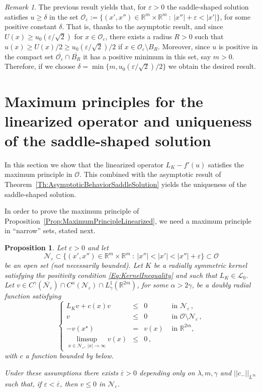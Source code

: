 \documentclass[12pt,reqno]{amsart}
\newtheorem{proposition}[theorem]{Proposition}
\theoremstyle{definition}
\theoremstyle{remark}
\newtheorem{remark}[theorem]{Remark}
\newcommand{\con}[1]{\mathbb{#1}}
\newcommand{\R}{\con{R}} %
\newcommand{\lcal}{\mathcal{L}}
\newcommand{\ncal}{\mathcal{N}}
\newcommand{\ocal}{\mathcal{O}}
\newcommand{\s}{\gamma}
\newcommand\beqc[1]{\left\{\begin{array}{#1}}
\newcommand\eeqc{\end{array} \right.}
\def\PDEsystem{rcll}
\def\ds{\displaystyle}
\numberwithin{equation}{section}
\begin{document}
\begin{remark}
	\label{Remark:u>delta}
	The previous result yields that, for $\varepsilon>0$ the saddle-shaped solution satisfies $u\geq\delta$ in the set $\ocal_\varepsilon := \{(x',x'')\in \R^m\times\R^m \ : \ |x''|+\varepsilon <|x'| \}$, for some positive constant $\delta$. That is, thanks to the asymptotic result, and since $U(x)\geq u_0(\varepsilon/\sqrt{2})$ for $x\in \ocal_\varepsilon$, there exists a radius $R>0$ such that $u(x)\geq U(x)/2\geq u_0(\varepsilon/\sqrt{2})/2$ if $x\in \ocal_\varepsilon\setminus B_R$. Moreover, since $u$ is positive in the compact set $\overline{\ocal_\varepsilon}\cap\overline{B_R}$ it has a positive minimum in this set, say $m>0$. Therefore, if we choose $\delta = \min\{m,u_0(\varepsilon/\sqrt{2})/2\}$ we obtain the desired result.
\end{remark}



\section{Maximum principles for the linearized operator and uniqueness of the saddle-shaped solution}
\label{Sec:MaximumPrinciple}

In this section we show that the linearized operator $L_K  -f'(u)$ satisfies the maximum principle in $\ocal$. This combined with the asymptotic result of Theorem~\ref{Th:AsymptoticBehaviorSaddleSolution} yields the uniqueness of the saddle-shaped solution.

In order to prove the maximum principle of Proposition~\ref{Prop:MaximumPrincipleLinearized}, we need a maximum principle in ``narrow'' sets, stated next.

\begin{proposition}
	\label{Prop:MaximumPrincipleNarrowDomainsOdd}
	Let $\varepsilon>0$ and let
	$$
	\ncal_\varepsilon \subset \{(x',x'')\in \R^m\times\R^m \ : \ |x''|<|x'|<|x''|+ \varepsilon\} \subset \ocal
	$$ 
	be an open set (not necessarily bounded).  
	Let $K$ be a radially symmetric kernel satisfying the positivity condition \eqref{Eq:KernelInequality} and such that $L_K\in \lcal_0$. Let $v\in C^\s(\overline{\ncal_\varepsilon})\cap C^\alpha(\ncal_\varepsilon)\cap L^1_\s(\R^{2m})$, for some $\alpha > 2\s$, be a doubly radial function satisfying
	\begin{equation}
	\label{Eq:AssumptionsMaxPNarrow}
	\beqc{\PDEsystem}
	L_K v + c(x)v&\leq & 0 &\textrm{ in } \ncal_\varepsilon\,,\\
	v &\leq & 0 &\textrm{ in } \ocal \setminus \ncal_\varepsilon\,,\\
	- v(x^\star) & = & v(x) &\textrm{ in } \R^{2m},\\
	\ds \limsup_{x\in \ncal_\varepsilon, \ |x|\to \infty} v(x) &\leq & 0\,,
	\eeqc
	\end{equation}
	with $c$ a function bounded by below.
	
	Under these assumptions there exists $\overline{\varepsilon}>0$ depending only on $\lambda, m, \s$ and $||c_-||_{L^\infty}$ such that, if $\varepsilon<\overline{\varepsilon}$, then $v \leq 0$ in $\ncal_\varepsilon$. 
\end{proposition}
\end{document}
